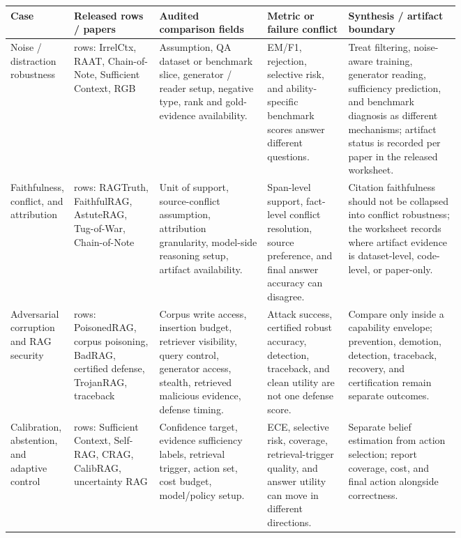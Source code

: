 \begin{table}[t]
\centering
\scriptsize
\renewcommand{\arraystretch}{0.86}
\begin{tabularx}{\linewidth}{>{\raggedright\arraybackslash}p{0.14\linewidth}>{\raggedright\arraybackslash}p{0.19\linewidth}>{\raggedright\arraybackslash}p{0.24\linewidth}>{\raggedright\arraybackslash}p{0.18\linewidth}X}
\toprule
\textbf{Case} & \textbf{Released rows / papers} & \textbf{Audited comparison fields} & \textbf{Metric or failure conflict} & \textbf{Synthesis / artifact boundary} \\
\midrule
Noise / distraction robustness & 5 rows: IrrelCtx, RAAT, Chain-of-Note, Sufficient Context, RGB & Assumption, QA dataset or benchmark slice, generator / reader setup, negative type, rank and gold-evidence availability. & EM/F1, rejection, selective risk, and ability-specific benchmark scores answer different questions. & Treat filtering, noise-aware training, generator reading, sufficiency prediction, and benchmark diagnosis as different mechanisms; artifact status is recorded per paper in the released worksheet. \\
Faithfulness, conflict, and attribution & 5 rows: RAGTruth, FaithfulRAG, AstuteRAG, Tug-of-War, Chain-of-Note & Unit of support, source-conflict assumption, attribution granularity, model-side reasoning setup, artifact availability. & Span-level support, fact-level conflict resolution, source preference, and final answer accuracy can disagree. & Citation faithfulness should not be collapsed into conflict robustness; the worksheet records where artifact evidence is dataset-level, code-level, or paper-only. \\
Adversarial corruption and RAG security & 6 rows: PoisonedRAG, corpus poisoning, BadRAG, certified defense, TrojanRAG, traceback & Corpus write access, insertion budget, retriever visibility, query control, generator access, stealth, retrieved malicious evidence, defense timing. & Attack success, certified robust accuracy, detection, traceback, and clean utility are not one defense score. & Compare only inside a capability envelope; prevention, demotion, detection, traceback, recovery, and certification remain separate outcomes. \\
Calibration, abstention, and adaptive control & 5 rows: Sufficient Context, Self-RAG, CRAG, CalibRAG, uncertainty RAG & Confidence target, evidence sufficiency labels, retrieval trigger, action set, cost budget, model/policy setup. & ECE, selective risk, coverage, retrieval-trigger quality, and answer utility can move in different directions. & Separate belief estimation from action selection; report coverage, cost, and final action alongside correctness. \\

\end{tabularx}
\end{table}
